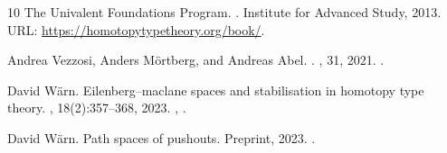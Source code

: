 \documentclass[10pt,a4paper]{amsart}
\theoremstyle{definition}
\begin{document}
\begin{thebibliography}{10}
The {Univalent Foundations Program}.
.
\newblock Institute for Advanced Study, 2013.
\newblock URL: \url{https://homotopytypetheory.org/book/}.

Andrea Vezzosi, Anders M{\"o}rtberg, and Andreas Abel.
.
, 31, 2021.
\newblock \href {https://doi.org/10.1145/3341691} {}.

David W{\"a}rn.
\newblock Eilenberg--maclane spaces and stabilisation in homotopy type theory.
, 18(2):357--368,
  2023.
\newblock \href {https://arxiv.org/abs/2301.03685} {},
  \href {https://doi.org/10.1007/s40062-023-00330-5}
  {}.

David W{\"a}rn.
\newblock Path spaces of pushouts.
\newblock Preprint, 2023.
\newblock \href {https://arxiv.org/abs/2402.12339} {}.

\end{thebibliography}
\end{document}
